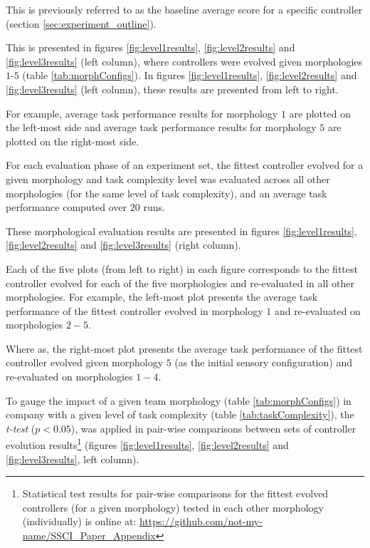 This is previously referred to as the baseline average score for a specific controller (section \ref{sec:experiment_outline}).

This is presented in figures \ref{fig:level1results}, \ref{fig:level2results} and \ref{fig:level3results}
(left column), where controllers were evolved given morphologies $1$-$5$ (table \ref{tab:morphConfigs}).
In figures \ref{fig:level1results}, \ref{fig:level2results} and \ref{fig:level3results} (left column),
these results are presented from left to right.

For example, average task performance results for morphology $1$ are plotted on the left-most side
and average task performance results for morphology $5$ are plotted on the right-most side.

For each evaluation phase of an experiment set, the fittest controller evolved for a given morphology and task complexity
level was evaluated across all other morphologies (for the same level of task complexity), and an
average task performance computed over $20$ runs.

These morphological evaluation results are presented in figures \ref{fig:level1results}, \ref{fig:level2results}
and \ref{fig:level3results} (right column).

Each of the five plots (from left to right) in each figure corresponds to the fittest controller evolved for each of the
five morphologies and re-evaluated in all other morphologies.  
For example, the left-most plot presents
the average task performance of the fittest controller evolved in morphology $1$ and re-evaluated on morphologies $2-5$.

Where as, the right-most plot presents the average task performance of the fittest controller evolved given morphology $5$
(as the initial sensory configuration) and re-evaluated on morphologies $1-4$.

To gauge the impact of a given team morphology (table \ref{tab:morphConfigs})
in company with a given level of task complexity (table \ref{tab:taskComplexity}),
the \textit{t-test} \cite{FlanneryTeukolsky1986} ($p < 0.05$),
was applied in pair-wise comparisons between sets of controller evolution
results\footnote{Statistical test results for pair-wise comparisons for the fittest evolved controllers
(for a given morphology) tested in each other morphology (individually) is online at:
\url{https://github.com/not-my-name/SSCI_Paper_Appendix}}
(figures \ref{fig:level1results}, \ref{fig:level2results} and \ref{fig:level3results}, left column).

